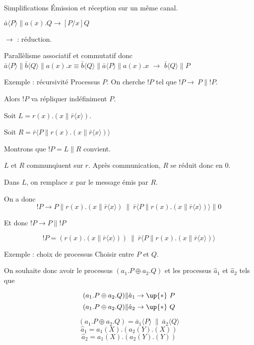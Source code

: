 \documentclass{beamer}
\def\+{\oplus}
\begin{document}
\begin{frame}{Simplifications}
Émission et réception sur un même canal.

$\bar{a}\langle P\rangle\|a(x).Q \rightarrow [P/x]Q$

$\rightarrow$ : réduction.

Parallèlisme associatif et commutatif donc 
$\bar{a}\langle P\rangle\|\bar{b}\langle Q\rangle\|a(x).x \equiv  \bar{b}\langle Q\rangle\|\bar{a}\langle P\rangle\|a(x).x$ $\rightarrow$ $\bar{b}\langle Q\rangle\|P$
\end{frame}

\begin{frame}{Exemple : récursivité}
Processus $P$. On cherche $!P$ tel que $!P\rightarrow\ P\|!P$.

Alors $!P$ va répliquer indéfiniment $P$.


Soit $L = r(x).(x\|\bar{r}\langle x\rangle)$.

Soit $R = \bar{r}\langle P\|r(x).(x\|\bar{r}\langle x\rangle)\rangle$

Montrons que $!P = L\|R$ convient.

$L$ et $R$ communqiuent sur $r$. Après communication, $R$ se réduit donc en $0$.

Dans $L$, on remplace $x$ par le message émis par $R$.


On a donc $$!P\rightarrow P\|r(x).(x\|\bar{r}\langle x\rangle)\ \|\ \bar{r}\langle P\|r(x).(x\|\bar{r}\langle x\rangle)\rangle\| 0$$

Et donc $!P\rightarrow P\|!P$
\begin{alertblock}{}
 $$!P = (r(x).(x\|\bar{r}\langle x\rangle))\ \|\ \bar{r}\langle P\|r(x).(x\|\bar{r}\langle x\rangle)\rangle$$
\end{alertblock}
\end{frame}

\begin{frame}{Exemple : choix de processus}
Choisir entre $P$ et $Q$.

On souhaite donc avoir le processus  $(a_1.P\+ a_2.Q)$ et les processus $\hat{a}_1$ et $\hat{a}_2$ tels que

$$(a_1.P\+ a_2.Q)\|\hat{a}_1\rightarrow\up{*}\ P$$
$$(a_1.P\+ a_2.Q)\|\hat{a}_2\rightarrow\up{*}\ Q$$

\begin{alertblock}{}
$$(a_1.P\+ a_2.Q) = \bar{a}_1\langle P\rangle\ \|\ \bar{a}_2\langle Q\rangle$$
$$\hat{a}_1 = a_1(X).(a_2(Y).(X))$$
$$\hat{a}_2 = a_1(X).(a_2(Y).(Y))$$
\end{alertblock}
\end{frame}
\end{document}
